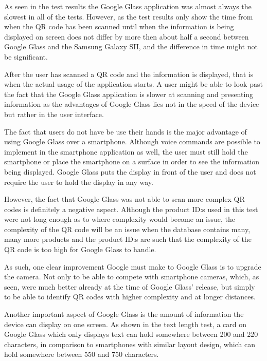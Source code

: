 As seen in the test results the Google Glass application was almost always the slowest in all of the tests. However, as the test results only show the time from when the QR code has been scanned until when the information is being displayed on screen does not differ by more then about half a second between Google Glass and the Samsung Galaxy SII, and the difference in time might not be significant. 

After the user has scanned a QR code and the information is displayed, that is when the actual usage of the application starts. A user might be able to look past the fact that the Google Glass application is slower at scanning and presenting information as the advantages of Google Glass lies not in the speed of the device but rather in the user interface.

The fact that users do not have be use their hands is the major advantage of using Google Glass over a smartphone. Although voice commands are possible to implement in the smartphone application as well, the user must still hold the smartphone or place the smartphone on a surface in order to see the information being displayed. Google Glass puts the display in front of the user and does not require the user to hold the display in any way.

However, the fact that Google Glass was not able to scan more complex QR codes is definitely a negative aspect. Although the product ID:s used in this test were not long enough as to where complexity would become an issue, the complexity of the QR code will be an issue when the database contains many, many more products and the product ID:s are such that the complexity of the QR code is too high for Google Glass to handle.

As such, one clear improvement Google must make to Google Glass is to upgrade the camera. Not only to be able to compete with smartphone cameras, which, as seen, were much better already at the time of Google Glass' release, but simply to be able to identify QR codes with higher complexity and at longer distances.

Another important aspect of Google Glass is the amount of information the device can display on one screen. As shown in the text length test, a card on Google Glass which only displays text can hold somewhere between 200 and 220 characters, in comparison to smartphones with similar layout design, which can hold somewhere between 550 and 750 characters.


